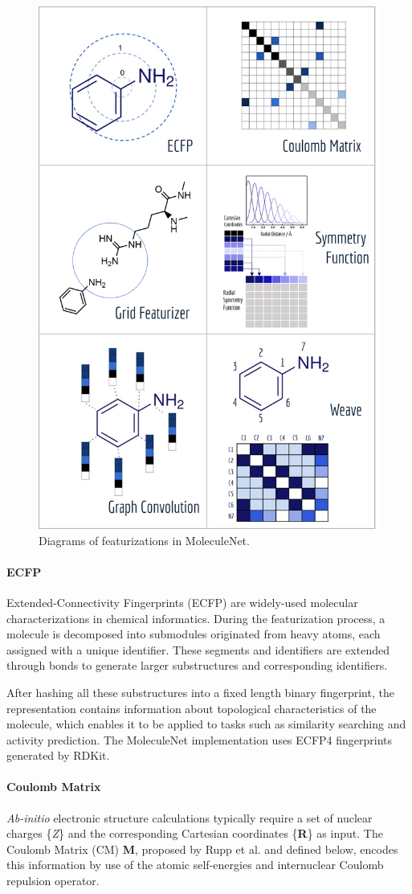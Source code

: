 \begin{figure}[h]
  \centering
  \includegraphics[width=.45\textwidth]{Images/molnet_feat.png}
  \caption{Diagrams of featurizations in MoleculeNet.}
  \label{fig:molnet_feat}
\end{figure}

\paragraph{ECFP}

Extended-Connectivity Fingerprints (ECFP) are widely-used molecular characterizations in chemical informatics.\cite{ECFP} During the featurization process, a molecule is decomposed into submodules originated from heavy atoms, each assigned with a unique identifier. These segments and identifiers are extended through bonds to generate larger substructures and corresponding identifiers.

After hashing all these substructures into a fixed length binary fingerprint, the representation contains information about topological characteristics of the molecule, which enables it to be applied to tasks such as similarity searching and activity prediction. The MoleculeNet implementation uses ECFP4 fingerprints generated by RDKit.\cite{RDKit}

\paragraph{Coulomb Matrix}

\textit{Ab-initio} electronic structure calculations typically require a set of nuclear charges \{\textit{Z}\} and the corresponding Cartesian coordinates \{\textbf{R}\} as input.  The Coulomb Matrix (CM) \textbf{M}, proposed by Rupp et al.\cite{GDB7_dataset_prl} and defined below, encodes this information by use of the atomic self-energies and internuclear Coulomb repulsion operator.

